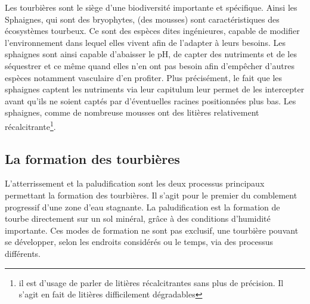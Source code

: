 Les tourbières sont le siège d'une biodiversité importante et spécifique.
Ainsi les Sphaignes, qui sont des bryophytes, (des mousses) sont caractéristiques des écosystèmes tourbeux.
Ce sont des espèces dites ingénieures, capable de modifier l'environnement dans lequel elles vivent afin de l'adapter à leurs besoins.
Les sphaignes sont ainsi capable d'abaisser le pH, de capter des nutriments et de les séquestrer et ce même quand elles n'en ont pas besoin afin d'empêcher d'autres espèces notamment vasculaire d'en profiter.
Plus précisément, le fait que les sphaignes captent les nutriments via leur capitulum leur permet de les intercepter avant qu'ils ne soient captés par d'éventuelles racines positionnées plus bas.
Les sphaignes, comme de nombreuse mousses ont des litières relativement récalcitrante\footnote{il est d'usage de parler de litières récalcitrantes sans plus de précision. Il s'agit en fait de litières difficilement dégradables}.

\subsection{La formation des tourbières}
L'atterrissement et la paludification sont les deux processus principaux permettant la formation des tourbières.
Il s'agit pour le premier du comblement progressif d'une zone d'eau stagnante.
La paludification est la formation de tourbe directement sur un sol minéral, grâce à des conditions d'humidité importante.
Ces modes de formation ne sont pas exclusif, une tourbière pouvant se développer, selon les endroits considérés ou le temps, via des processus différents.

